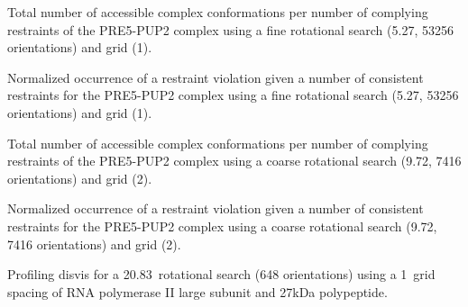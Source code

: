 
\stopbuffer

\caption{}
{Total number of accessible complex conformations per number of complying
restraints of the PRE5-PUP2 complex using a fine rotational search (5.27\Deg,
53256 orientations) and grid (1\Angstrom).}
\stopbuffer


\stopbuffer

\caption{}
{Normalized occurrence of a restraint violation given a number of consistent
restraints for the PRE5-PUP2 complex using a fine rotational search (5.27\Deg,
53256 orientations) and grid (1\Angstrom).}
\stopbuffer


\stopbuffer


\caption{}
{Total number of accessible complex conformations per number of complying
restraints of the PRE5-PUP2 complex using a coarse rotational search (9.72\Deg,
7416 orientations) and grid (2\Angstrom).}
\stopbuffer


\stopbuffer

\caption{}
{Normalized occurrence of a restraint violation given a number of consistent
restraints for the PRE5-PUP2 complex using a coarse rotational search (9.72\Deg,
7416 orientations) and grid (2\Angstrom).}
\stopbuffer


\stopbuffer

\caption{}
{Profiling disvis for a 20.83\Deg\ rotational search (648 orientations) using a
1\Angstrom\ grid spacing of RNA polymerase II large subunit and 27kDa
polypeptide.}
\stopbuffer


\stopbuffer
